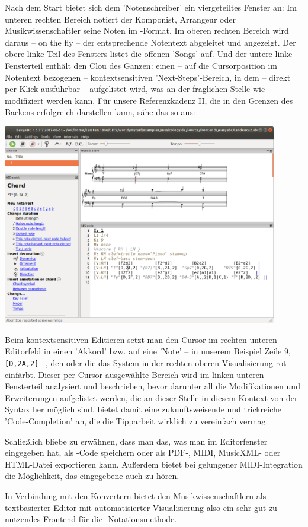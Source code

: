 Nach dem Start bietet sich dem 'Notenschreiber' ein viergeteiltes Fenster an: Im
unteren rechten Bereich notiert der Komponist, Arrangeur oder
Musikwissenschaftler seine Noten im -Format. Im oberen rechten Bereich
wird daraus -- on the fly -- der entsprechende Notentext abgeleitet und
angezeigt. Der obere linke Teil des Fensters listet die offenen 'Songs' auf. Und
der untere linke Fensterteil enthält den Clou des Ganzen: einen -- auf die
Cursorposition im Notentext bezogenen -- kontextsensitiven 'Next-Steps'-Bereich,
in dem -- direkt per Klick ausführbar -- aufgelistet wird, was an der fraglichen
Stelle wie modifiziert werden kann. Für unsere Referenzkadenz II, die
 in den Grenzen des Backens erfolgreich darstellen kann, sähe das
so aus:

\begin{center}
\includegraphics[width=0.9\textwidth]{frontends/easyabc/easyabc-cadenca2-300dpi.png}
\end{center}

Beim kontextsensitiven Editieren setzt man den Cursor im rechten unteren
Editorfeld in einen 'Akkord' bzw. auf eine 'Note' -- in unserem Beispiel Zeile
9, \texttt{[D,2A,2]} --, den oder die das System in der rechten oberen
Visualisierung rot einfärbt. Dieser per Cursor ausgewählte Bereich wird im
linken unteren Fensterteil analysiert und beschrieben, bevor darunter all die
Modifikationen und Erweiterungen aufgelistet werden, die an dieser Stelle in
diesem Kontext von der -Syntax her möglich sind.  bietet
damit eine zukunftsweisende und trickreiche 'Code-Completion' an, die die
Tipparbeit wirklich zu vereinfach vermag.

Schließlich bliebe zu erwähnen, dass man das, was man im Editorfenster
eingegeben hat, als -Code speichern oder als PDF-, MIDI, MusicXML- oder
HTML-Datei exportieren kann. Außerdem bietet  bei gelungener
MIDI-Integration die Möglichkeit, das eingegebene auch zu hören.

In Verbindung mit den Konvertern bietet  den Musikwissenschaftlern
als textbasierter Editor mit automatisierter Visualisierung also ein sehr gut zu
nutzendes Frontend für die -Notationsmethode.

%

